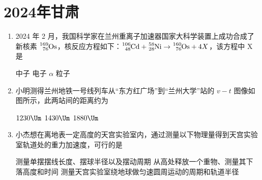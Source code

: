 \documentclass[\gkver]{gaokaozhenti}
\begin{document}
\chapter{2024年甘肃}

\begin{enumerate}
\item
2024 年 2 月，我国科学家在兰州重离子加速器国家大科学装置上成功合成了新核素 $\ce{^{169}_{76}Os}$，核反应方程如下：$\ce{^{106}_{48}Cd} + \ce{^{58}_{28}Ni} \to \ce{^{160}_{76}Os} + 4X$，该方程中 X 是

{中子}
{电子}
{$\alpha$ 粒子}


\item
小明测得兰州地铁一号线列车从“东方红广场”到“兰州大学”站的 $v - t$ 图像如图所示，此两站间的距离约为


\fourchoices[answer=C]
{$980 \Um$}
{$1230 \Um$}
{$1430 \Um$}
{$1880 \Um$}


\item
小杰想在离地表一定高度的天宫实验室内，通过测量以下物理量得到天宫实验室轨道处的重力加速度，可行的是

{测量单摆摆线长度、摆球半径以及摆动周期}
{从高处释放一个重物、测量其下落高度和时间}
{测量天宫实验室绕地球做匀速圆周运动的周期和轨道半径}

\end{enumerate}
\end{document}
